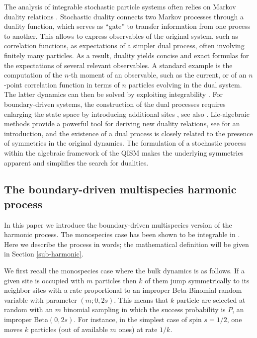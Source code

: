 \documentclass[11pt]{article}
\numberwithin{equation}{section}
\begin{document}
The  analysis of integrable stochastic particle systems often relies on Markov duality relations \cite{liggett1985interacting, schutz1997duality, demasi2006mathematical, dualityBook}. Stochastic duality connects two Markov processes through a duality function,
which serves as ``gate''
to transfer information 
from one process to another.
This allows to express observables of the original system, such as correlation functions, as expectations of a  simpler dual process, often involving finitely many particles. As a result, duality yields concise and exact formulas for the expectations of several relevant observables. A standard example is the computation of the $n$-th moment of an observable, such as the current, or of an $n$-point correlation function in terms of $n$ particles evolving in the dual system. The latter dynamics can then be solved by exploiting integrability  \cite{borodin2014duality}. For boundary-driven systems, the construction of the dual processes requires enlarging the state space by introducing additional sites \cite{Spohn_1983,kipnis1982heat}, see also \cite{2023JPhA...56A4001S}.
Lie-algebraic methods provide a powerful tool for deriving new duality relations, see  \cite{dualityBook} for an introduction, and the existence of a dual process is closely related to the presence of symmetries in the original dynamics.
The formulation of a stochastic process within the algebraic framework of the QISM makes the underlying symmetries apparent and simplifies the search for dualities.











\subsection{The boundary-driven multispecies harmonic process}

In this paper we introduce 
the boundary-driven multispecies version of the harmonic process. The monospecies case has been shown to be integrable in \cite{Frassek:2019vjt}.  
Here we describe the process
in words; the mathematical definition will be given in Section \ref{sub-harmonic}.

We first recall the monospecies case where the bulk dynamics is as follows. If a given site is occupied with $m$ particles then $k$ of them jump symmetrically to its neighbor sites with a rate proportional to an improper Beta-Binomial random variable with parameter $(m;0,2s)$. This means that $k$ particle are selected at random with an $m$ binomial sampling in which the success probability is $P$,
an improper Beta$(0,2s)$. For instance, in the simplest case of spin $s=1/2$, one moves $k$ particles (out of available $m$ ones) at rate $1/k$.  
\end{document}
